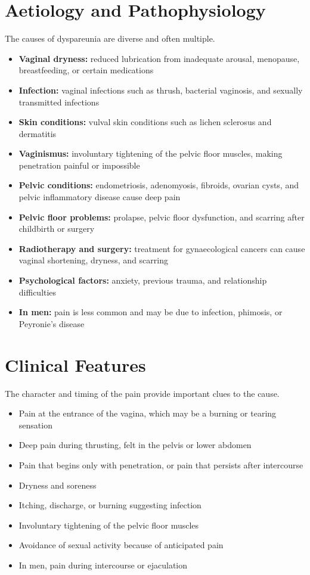 \section*{Aetiology and Pathophysiology}
The causes of dyspareunia are diverse and often multiple.
\begin{itemize}
    \item \textbf{Vaginal dryness:} reduced lubrication from inadequate arousal, menopause, breastfeeding, or certain medications
    \item \textbf{Infection:} vaginal infections such as thrush, bacterial vaginosis, and sexually transmitted infections
    \item \textbf{Skin conditions:} vulval skin conditions such as lichen sclerosus and dermatitis
    \item \textbf{Vaginismus:} involuntary tightening of the pelvic floor muscles, making penetration painful or impossible
    \item \textbf{Pelvic conditions:} endometriosis, adenomyosis, fibroids, ovarian cysts, and pelvic inflammatory disease cause deep pain
    \item \textbf{Pelvic floor problems:} prolapse, pelvic floor dysfunction, and scarring after childbirth or surgery
    \item \textbf{Radiotherapy and surgery:} treatment for gynaecological cancers can cause vaginal shortening, dryness, and scarring
    \item \textbf{Psychological factors:} anxiety, previous trauma, and relationship difficulties
    \item \textbf{In men:} pain is less common and may be due to infection, phimosis, or Peyronie's disease
\end{itemize}

\section*{Clinical Features}
The character and timing of the pain provide important clues to the cause.
\begin{itemize}
    \item Pain at the entrance of the vagina, which may be a burning or tearing sensation
    \item Deep pain during thrusting, felt in the pelvis or lower abdomen
    \item Pain that begins only with penetration, or pain that persists after intercourse
    \item Dryness and soreness
    \item Itching, discharge, or burning suggesting infection
    \item Involuntary tightening of the pelvic floor muscles
    \item Avoidance of sexual activity because of anticipated pain
    \item In men, pain during intercourse or ejaculation
\end{itemize}

